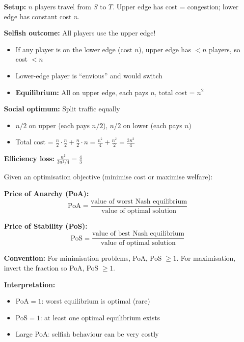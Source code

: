 \begin{exbox}
\begin{center}
\end{center}

\textbf{Setup:} $n$ players travel from $S$ to $T$. Upper edge has cost = congestion; lower edge has constant cost $n$.

\textbf{Selfish outcome:} All players use the upper edge!
\begin{itemize}
  \item If any player is on the lower edge (cost $n$), upper edge has $< n$ players, so cost $< n$
  \item Lower-edge player is ``envious'' and would switch
  \item \textbf{Equilibrium:} All on upper edge, each pays $n$, total cost = $n^2$
\end{itemize}

\textbf{Social optimum:} Split traffic equally
\begin{itemize}
  \item $n/2$ on upper (each pays $n/2$), $n/2$ on lower (each pays $n$)
  \item Total cost = $\frac{n}{2} \cdot \frac{n}{2} + \frac{n}{2} \cdot n = \frac{n^2}{4} + \frac{n^2}{2} = \frac{3n^2}{4}$
\end{itemize}

\textbf{Efficiency loss:} $\displaystyle\frac{n^2}{3n^2/4} = \frac{4}{3}$
\end{exbox}

\begin{defbox}
Given an optimisation objective (minimise cost or maximise welfare):

\textbf{Price of Anarchy (PoA):}
\[
\text{PoA} = \frac{\text{value of worst Nash equilibrium}}{\text{value of optimal solution}}
\]

\textbf{Price of Stability (PoS):}
\[
\text{PoS} = \frac{\text{value of best Nash equilibrium}}{\text{value of optimal solution}}
\]

\textbf{Convention:} For minimisation problems, PoA, PoS $\geq 1$. For maximisation, invert the fraction so PoA, PoS $\geq 1$.

\textbf{Interpretation:}
\begin{itemize}
  \item $\text{PoA} = 1$: worst equilibrium is optimal (rare)
  \item $\text{PoS} = 1$: at least one optimal equilibrium exists
  \item Large PoA: selfish behaviour can be very costly
\end{itemize}
\end{defbox}

